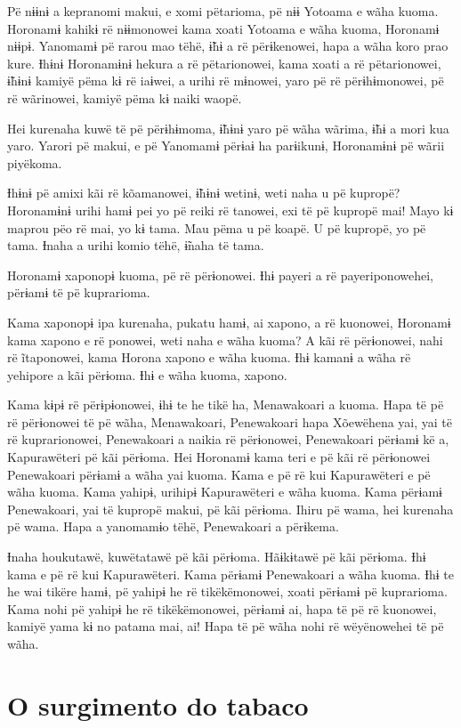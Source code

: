 Pë nɨɨnɨ a kepranomi makui, e xomi pëtarioma, pë nɨɨ Yotoama e wãha
kuoma. Horonamɨ kahikɨ rë nɨɨmonowei kama xoati Yotoama e wãha kuoma,
Horonamɨ nɨɨpɨ. Yanomamɨ pë rarou mao tëhë, ɨ̃hɨ a rë përɨkenowei, hapa a
wãha koro prao kure. Ɨhɨnɨ Horonamɨnɨ hekura a rë pëtarionowei, kama
xoati a rë pëtarionowei, ɨ̃hɨnɨ kamiyë pëma kɨ rë iaɨwei, a urihi rë
mɨnowei, yaro pë rë përɨhɨmonowei, pë rë wãrinowei, kamiyë pëma kɨ naiki
waopë. 

Hei kurenaha kuwë të pë përɨhɨmoma, ɨ̃hɨnɨ yaro pë wãha wãrima, ɨ̃hɨ a
mori kua yaro. Yarori pë makui, e pë Yanomamɨ përɨaɨ ha parɨikunɨ,
Horonamɨnɨ pë wãrii piyëkoma. 

Ɨhɨnɨ pë amixi kãi rë kõamanowei, ɨ̃hɨnɨ wetinɨ, weti naha u pë kupropë?
Horonamɨnɨ urihi hamɨ pei yo pë reiki rë tanowei, exi të pë kupropë mai!
Mayo kɨ maprou pëo rë mai, yo kɨ tama. Mau pëma u pë koapë. U pë
kupropë, yo pë tama. Ɨnaha a urihi komio tëhë, ɨ̃naha të tama. 

Horonamɨ xaponopɨ kuoma, pë rë përɨonowei. Ɨhɨ payeri a rë
payeriponowehei, përɨamɨ të pë kuprarioma. 

Kama xaponopɨ ipa kurenaha, pukatu hamɨ, ai xapono, a rë kuonowei,
Horonamɨ kama xapono e rë ponowei, weti naha e wãha kuoma? A kãi rë
përɨonowei, nahi rë ĩtaponowei, kama Horona xapono e wãha kuoma. Ɨhɨ
kamanɨ a wãha rë yehipore a kãi përɨoma. Ɨhɨ e wãha kuoma, xapono. 

Kama kɨpɨ rë përɨpɨonowei, ɨhɨ te he tikë ha, Menawakoari a kuoma. Hapa
të pë rë përɨonowei të pë wãha, Menawakoari, Penewakoari hapa Xõewëhena
yai, yai të rë kuprarionowei, Penewakoari a naikia rë përɨonowei,
Penewakoari përɨamɨ kë a, Kapurawëteri pë kãi përɨoma. Hei Horonamɨ kama
teri e pë kãi rë përɨonowei Penewakoari përɨamɨ a wãha yai kuoma. Kama e
pë rë kui Kapurawëteri e pë wãha kuoma. Kama yahipɨ, urihipɨ
Kapurawëteri e wãha kuoma. Kama përɨamɨ Penewakoari, yai të kupropë
makui, pë kãi përɨoma. Ihiru pë wama, hei kurenaha pë wama. Hapa a
yanomamɨo tëhë, Penewakoari a përɨkema. 

Ɨnaha houkutawë, kuwëtatawë pë kãi përɨoma. Hãɨkɨtawë pë kãi përɨoma.
Ɨhɨ kama e pë rë kui Kapurawëteri. Kama përɨamɨ Penewakoari a wãha
kuoma. Ɨhɨ te he wai tikëre hamɨ, pë yahipɨ he rë tikëkëmonowei, xoati
përɨamɨ pë kuprarioma. Kama nohi pë yahipɨ he rë tikëkëmonowei, përɨamɨ
ai, hapa të pë rë kuonowei, kamiyë yama kɨ no patama mai, ai! Hapa të pë
wãha nohi rë wëyënowehei të pë wãha.
 
\chapter{O surgimento do tabaco}
 
